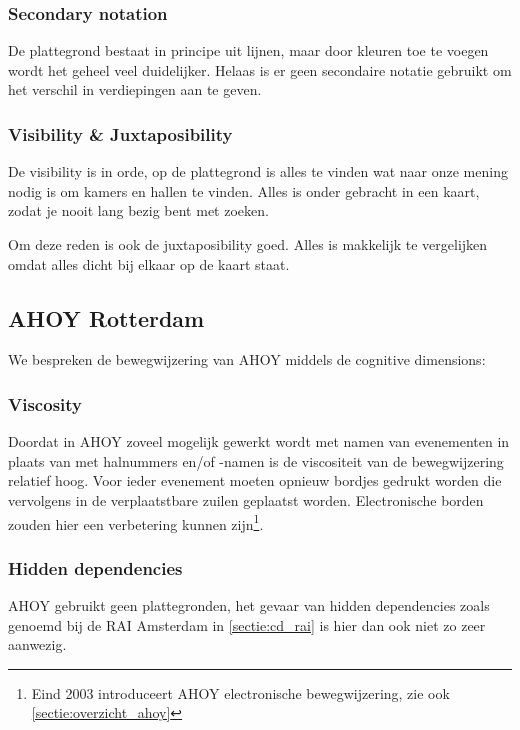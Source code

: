 \subsubsection{Secondary notation}

De plattegrond bestaat in principe uit lijnen, maar door kleuren toe te voegen wordt het geheel veel duidelijker. Helaas is er geen secondaire notatie gebruikt om het verschil in verdiepingen aan te geven.


\subsubsection{Visibility \& Juxtaposibility}

De visibility is in orde, op de plattegrond is alles te vinden wat naar onze mening nodig is om kamers en hallen te vinden. Alles is onder gebracht in een kaart, zodat je nooit lang bezig bent met zoeken.

Om deze reden is ook de juxtaposibility goed. Alles is makkelijk te vergelijken omdat alles dicht bij elkaar op de kaart staat.


\subsection{AHOY Rotterdam}

We bespreken de bewegwijzering van AHOY middels de cognitive dimensions:


\subsubsection{Viscosity}

Doordat in AHOY zoveel mogelijk gewerkt wordt met namen van evenementen in plaats van met halnummers en/of -namen is de viscositeit van de bewegwijzering relatief hoog. Voor ieder evenement moeten opnieuw bordjes gedrukt worden die vervolgens in de verplaatstbare zuilen geplaatst worden. Electronische borden zouden hier een verbetering kunnen zijn\footnote{Eind 2003 introduceert AHOY electronische bewegwijzering, zie ook \ref{sectie:overzicht_ahoy}}.


\subsubsection{Hidden dependencies}

AHOY gebruikt geen plattegronden, het gevaar van hidden dependencies zoals genoemd bij de RAI Amsterdam in \ref{sectie:cd_rai} is hier dan ook niet zo zeer aanwezig.


